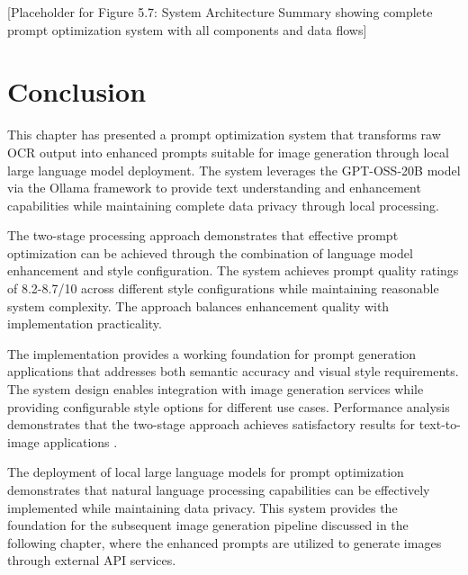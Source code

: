 [Placeholder for Figure 5.7: System Architecture Summary showing complete prompt optimization system with all components and data flows]

\section{Conclusion}

This chapter has presented a prompt optimization system that transforms raw OCR output into enhanced prompts suitable for image generation through local large language model deployment. The system leverages the GPT-OSS-20B model via the Ollama framework to provide text understanding and enhancement capabilities while maintaining complete data privacy through local processing.

The two-stage processing approach demonstrates that effective prompt optimization can be achieved through the combination of language model enhancement and style configuration. The system achieves prompt quality ratings of 8.2-8.7/10 across different style configurations while maintaining reasonable system complexity. The approach balances enhancement quality with implementation practicality.

The implementation provides a working foundation for prompt generation applications that addresses both semantic accuracy and visual style requirements. The system design enables integration with image generation services while providing configurable style options for different use cases. Performance analysis demonstrates that the two-stage approach achieves satisfactory results for text-to-image applications \cite{zhang2024simplicity, liu2024comprehensive}.

The deployment of local large language models for prompt optimization demonstrates that natural language processing capabilities can be effectively implemented while maintaining data privacy. This system provides the foundation for the subsequent image generation pipeline discussed in the following chapter, where the enhanced prompts are utilized to generate images through external API services.